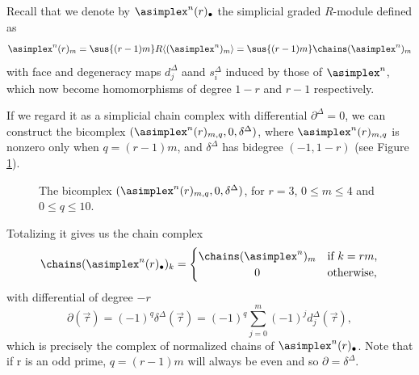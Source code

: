 \begin{example}
Recall that we denote by $\asimplex^n(r)_\bullet$ the simplicial graded $R$-module defined as
\[
\asimplex^n(r)_m=\sus{(r-1)m} R\langle (\asimplex^n)_m\rangle = \sus{(r-1)m}\chains(\asimplex^n)_m
\]
with face and degeneracy maps $d^\Delta_j$ aand $s^\Delta_i$  induced by those of $\asimplex^n$, which now become homomorphisms of degree $1-r$ and $r-1$ respectively. 

If we regard it as a simplicial chain complex with differential $\partial^\Delta=0$, we can construct the bicomplex $(\asimplex^n(r)_{m,q}, 0, \delta^\Delta)$, where $\asimplex^n(r)_{m,q}$ is nonzero only when $q=(r-1)m$, and $\delta^\Delta$ has bidegree $(-1,1-r)$ (see Figure \ref{fig Delta}).

\begin{figure}[ht!]
	
	\caption{The bicomplex $(\asimplex^n(r)_{m,q}, 0, \delta^\Delta)$, for $r=3$, $0\leq m\leq 4$ and $0\leq q\leq 10$.}
	\label{fig Delta}
\end{figure}

Totalizing it gives us the chain complex 
\begin{align*}
\chains(\asimplex^n(r)_\bullet)_k = \begin{cases} \chains(\asimplex^n)_{m} & \text{if $k = rm$,} \\ \hfil0 & \text{otherwise,} \end{cases}
\end{align*}
with differential of degree $-r$
\[
\partial (\vec\tau) =(-1)^q\delta^\Delta(\vec\tau)= (-1)^q\sum_{j=0}^m(-1)^jd^\Delta_j(\vec\tau), 
\]
which is precisely the complex of normalized chains of $\asimplex^n(r)_\bullet$. Note that if r is an odd prime, $q=(r-1)m$ will always be even and so $\partial=\delta^\Delta$.


\end{example}


